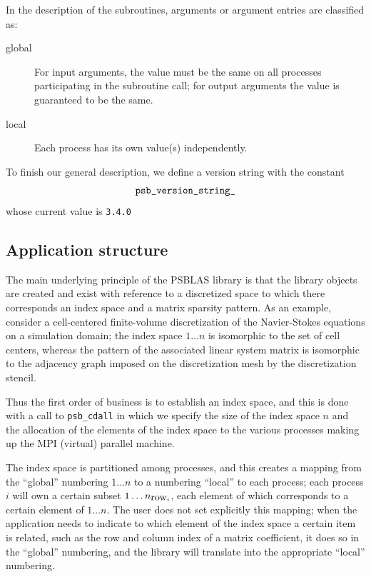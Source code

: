 In the description of the subroutines, arguments or argument entries
are classified as:
\begin{description}
\item[global] For input arguments, the value must be the same on all processes
  participating in the subroutine call; for output arguments the value
  is guaranteed to be the same.
\item[local] Each process has its own value(s) independently.
\end{description}
To finish our general description, we define a version string with the
constant 
\[ \verb|psb_version_string_|\]
whose current value is \verb|3.4.0|

\subsection{Application structure}
\label{sec:appstruct}

The main underlying principle of the PSBLAS library is that the
library objects are created and exist with reference to a discretized
space to which there corresponds an index space and a matrix sparsity
pattern. As an example, consider a cell-centered finite-volume
discretization of  the Navier-Stokes equations on a simulation domain;
the index space $1\dots n$ is isomorphic to the set of cell centers,
whereas the pattern of the associated linear system matrix is
isomorphic to the adjacency graph imposed on the discretization mesh
by the discretization stencil. 

Thus the first order of business is to establish an index space, and
this is done with a call to  \verb|psb_cdall| in which we specify the
size of the index space $n$ and the allocation of the elements of the
index space to the various processes making up the MPI (virtual)
parallel machine. 

The index space is partitioned among processes, and this creates a
mapping from the ``global'' numbering $1\dots n$ to a numbering
``local'' to each process; each process $i$ will own a certain subset
$1\dots n_{\hbox{row}_i}$, each element of which corresponds to a certain
element of $1\dots n$. The user does not set explicitly this mapping;
when the application needs to indicate to which element of the index
space a certain item is related, such as the row and column index of a
matrix coefficient, it does so in the ``global'' numbering, and the
library will translate into the appropriate ``local'' numbering. 

